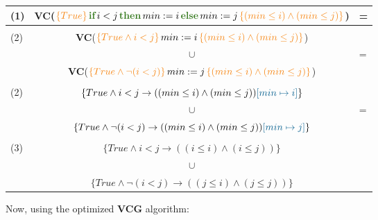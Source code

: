 \documentclass[11pt]{article}
\newcommand{\kw}[1]{{\color{OliveGreen}{#1}}}
\newcommand{\hblue}[1]{{\color{MidnightBlue}{#1}}}
\newcommand{\hoaret}[3]{{\color{BurntOrange}{\{#1\}}}\,#2\,{\color{BurntOrange}{\{#3\}}}}
\begin{document}
\begin{tabular}{lcl}
  (1) & \textbf{VC}($\hoaret{True}{\textbf{\kw{if}}\,i<j\,\textbf{\kw{then}}\,min := i\,\textbf{\kw{else}}\,min := j}{(min \leq i) \land (min \leq j)}$) & =\\[2ex]\hline\\
  \multirow{3}{*}{(2)} &\textbf{VC}($\hoaret{True \land i < j}{min := i}{(min \leq i) \land (min \leq j)}$) \\
  & \multicolumn{1}{c}{$\cup$} & =\\ 
  & \textbf{VC}($\hoaret{True \land \neg(i < j)}{min := j}{(min \leq i) \land (min \leq j)}$)\\[2ex]\hline\\
  \multirow{3}{*}{(2)} & $\{True \land i < j \to ((min \leq i) \land (min \leq j))\hblue{[min \mapsto i]}\}$ \\
  & \multicolumn{1}{c}{$\cup$} & =\\
  & $\{True \land \neg(i < j) \to ((min \leq i) \land (min \leq j))\hblue{[min \mapsto j]}\}$\\[2ex]\hline\\
  \multirow{3}{*}{(3)} & $\{True \land i < j \to ((i \leq i) \land (i \leq j))\}$ \\
  & \multicolumn{1}{c}{$\cup$}\\
  & $\{True \land \neg(i < j) \to ((j \leq i) \land (j \leq j))\}$ 
\end{tabular}

\newpage
Now, using the optimized \textbf{VCG} algorithm:\\
\end{document}
